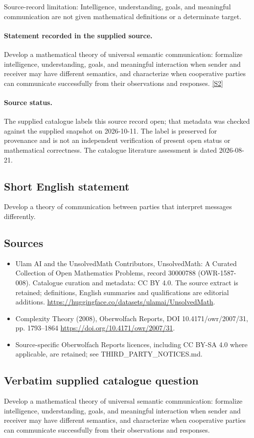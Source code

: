 \documentclass[11pt]{article}
\begin{document}
Source-record limitation: Intelligence, understanding, goals, and meaningful communication are not given mathematical definitions or a determinate target.
\paragraph{Statement recorded in the supplied source.}
Develop a mathematical theory of universal semantic communication: formalize intelligence, understanding, goals, and meaningful interaction when sender and receiver may have different semantics, and characterize when cooperative parties can communicate successfully from their observations and responses. \href{https://doi.org/10.4171/owr/2007/31}{[S2]}
\paragraph{Source status.}
The supplied catalogue labels this source record open; that metadata was checked against the supplied snapshot on 2026-10-11. The label is preserved for provenance and is not an independent verification of present open status or mathematical correctness. The catalogue literature assessment is dated 2026-08-21.
\subsection{Short English statement}
Develop a theory of communication between parties that interpret messages differently.
\subsection{Sources}
\begin{itemize}
\item[S1] Ulam AI and the UnsolvedMath Contributors, UnsolvedMath: A Curated Collection of Open Mathematics Problems, record 30000788 (OWR-1587-008). Catalogue curation and metadata: CC BY 4.0. The source extract is retained; definitions, English summaries and qualifications are editorial additions.
\url{https://huggingface.co/datasets/ulamai/UnsolvedMath}.
\item[S2] Complexity Theory (2008), Oberwolfach Reports, DOI 10.4171/owr/2007/31, pp. 1793--1864
\url{https://doi.org/10.4171/owr/2007/31}.
\item Source-specific Oberwolfach Reports licences, including CC BY-SA 4.0 where applicable, are retained; see THIRD\_PARTY\_NOTICES.md.
\end{itemize}
\subsection{Verbatim supplied catalogue question}
Develop a mathematical theory of universal semantic communication: formalize intelligence, understanding, goals, and meaningful interaction when sender and receiver may have different semantics, and characterize when cooperative parties can communicate successfully from their observations and responses.
\end{document}
